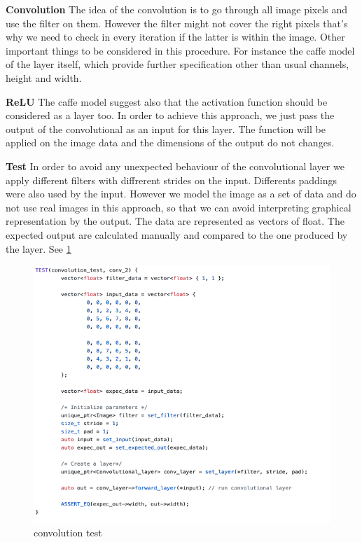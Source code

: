 \documentclass[parskip=full]{scrartcl}
\newcommand\tab[1][1cm]{\hspace*{#1}}
\begin{document}
	\textbf {Convolution}
	\tab  The idea of the convolution is to go through all image pixels and use the filter on them. However the filter might not cover the right pixels that's why we need to check in every iteration if the latter is within the image. Other important things to be considered in this procedure. For instance the caffe model of the layer itself, which provide further specification other than usual channels, height and width.
	
	\textbf {ReLU}
	\tab The caffe model suggest also that the activation function should be considered as a layer too. In order to achieve this approach, we just pass the output of the convolutional as an input for this layer. The function will be applied on the image data and the dimensions of the output do not changes.

	\textbf {Test}
	\tab In order to avoid any unexpected behaviour of the convolutional layer we apply different filters with diffrerent strides on the input. Differents paddings were also used by the input. However we model the image as a set of data and do not use real images
in this approach, so that we can avoid interpreting graphical representation by the output. The data are represented as vectors of float. The expected output are calculated manually and compared to the one produced by the layer. See \ref{fig:convolution_test} %

\begin{figure}[h]
		\centering
		\includegraphics[width=1\textwidth]{convolution_test}
		\caption{convolution test}
		\label{fig:convolution_test}
\end{figure}
\end{document}
